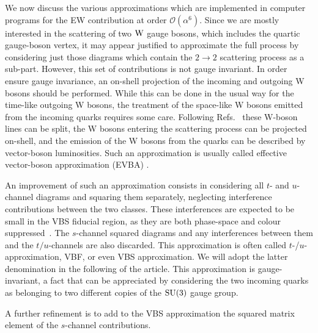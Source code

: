 We now discuss the various approximations which are implemented in computer programs for the EW contribution at order $\mathcal{O}{\left(\alpha^{6}\right)}$.
Since we are mostly interested in 
the scattering of two $\text{W}$ gauge bosons, which includes the quartic gauge-boson vertex, it may appear justified to approximate the 
full process by considering just those diagrams which contain the $2\rightarrow 2$ scattering process as a sub-part.
However, this set of contributions is not gauge invariant.
In order ensure gauge invariance, an on-shell projection of
the incoming and outgoing W bosons should be performed.
While this can be done in the usual way for the time-like
outgoing W bosons, the treatment of the space-like W bosons
emitted from the incoming quarks requires some care.
Following Refs.~\cite{Kuss:1995yv,Accomando:2006hq} these W-boson lines can be split,
the W bosons entering the scattering process can be projected
on-shell, and the emission of the W bosons from the quarks can be
described by vector-boson luminosities.
Such an approximation is usually called effective vector-boson
approximation (EVBA) \cite{Dawson:1984gx,Duncan:1985vj,Cahn:1983ip}.

An improvement of such an approximation consists 
in considering all $t$- and $u$-channel diagrams and squaring them separately, neglecting interference contributions between the two classes.
These interferences are expected to be small in the VBS fiducial region, as they are both phase-space and colour suppressed~\cite{Oleari:2003tc,Denner:2012dz}.
The $s$-channel squared diagrams and any interferences between them and the  $t/u$-channels are also discarded.
This approximation is often called $t$-/$u$- approximation, VBF, or even VBS approximation.
We will adopt the latter denomination in the following of the article.
This approximation is gauge-invariant, a fact that can be appreciated by considering the two incoming quarks as belonging to two different copies of the $\rm{SU}(3)$ gauge group.

A further refinement is to add to the VBS approximation the squared matrix element of the $s$-channel contributions.

